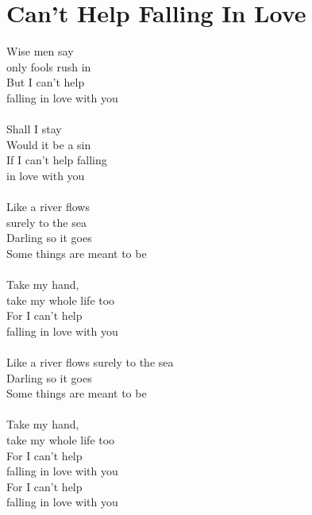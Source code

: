 \section{Can't Help Falling In Love}
Wise men say\\
only fools rush in\\
But I can't help\\
falling in love with you\\
\\
Shall I stay\\
Would it be a sin\\
If I can't help falling\\
in love with you\\
\\
Like a river flows\\
surely to the sea\\
Darling so it goes\\
Some things are meant to be\\
\\
Take my hand,\\
take my whole life too\\
For I can't help\\
falling in love with you\\
\\
Like a river flows surely to the sea\\
Darling so it goes\\
Some things are meant to be\\
\\
Take my hand,\\
take my whole life too\\
For I can't help\\
falling in love with you\\
For I can't help\\
falling in love with you\\